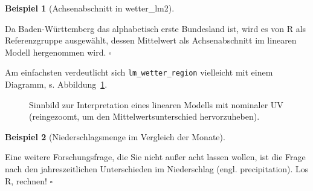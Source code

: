\documentclass[
  letterpaper,
  oneside,
  open=any]{scrbook}
\theoremstyle{definition}
\theoremstyle{definition}
\newtheorem{example}{Beispiel}[chapter]
\theoremstyle{definition}
\theoremstyle{remark}
\begin{document}
\begin{example}[Achsenabschnitt in
wetter\_lm2]\protect\hypertarget{exm-bawü}{}\label{exm-bawü}

Da Baden-Württemberg das alphabetisch erste Bundesland ist, wird es von
R als Referenzgruppe ausgewählt, dessen Mittelwert als Achsenabschnitt
im linearen Modell hergenommen wird. \(\square\)

\end{example}

Am einfachsten verdeutlicht sich \texttt{lm\_wetter\_region} vielleicht
mit einem Diagramm, s. Abbildung~\ref{fig-bin-nom}.

\begin{figure}


\caption{\label{fig-bin-nom}Sinnbild zur Interpretation eines linearen
Modells mit nominaler UV (reingezoomt, um den Mittelwertsunterschied
hervorzuheben).}

\end{figure}%

\begin{example}[Niederschlagsmenge im Vergleich der
Monate]\protect\hypertarget{exm-months}{}\label{exm-months}

Eine weitere Forschungsfrage, die Sie nicht außer acht lassen wollen,
ist die Frage nach den jahreszeitlichen Unterschieden im Niederschlag
(engl. precipitation). Los R, rechnen! \(\square\)

\end{example}
\end{document}
